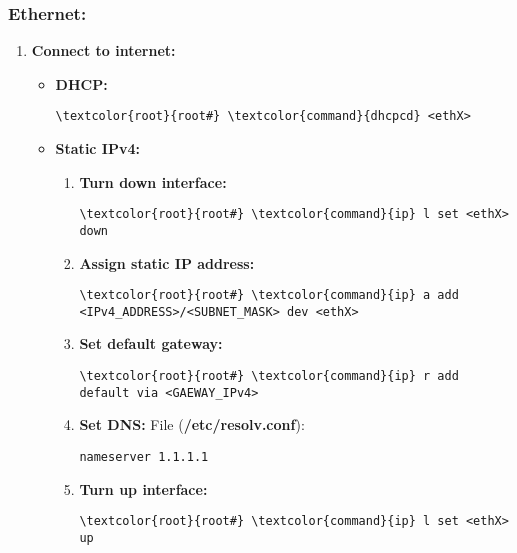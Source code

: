 \documentclass[10pt, a4paper, onecolumn, openany]{book} %
\begin{document}
\subsubsection{Ethernet:}
\begin{enumerate}
    \item \textbf{Connect to internet:}
    \begin{itemize}
        \item \textbf{DHCP:}
 \begin{Verbatim}[commandchars=\\\{\}]
\textcolor{root}{root#} \textcolor{command}{dhcpcd} <ethX>
\end{Verbatim}       
        \item \textbf{Static IPv4:}
        \begin{enumerate}
            \item \textbf{Turn down interface:}
\begin{Verbatim}[commandchars=\\\{\}]
\textcolor{root}{root#} \textcolor{command}{ip} l set <ethX> down
\end{Verbatim}
            \item \textbf{Assign static IP address:}
\begin{Verbatim}[commandchars=\\\{\}]
\textcolor{root}{root#} \textcolor{command}{ip} a add <IPv4_ADDRESS>/<SUBNET_MASK> dev <ethX>
\end{Verbatim}
            \item \textbf{Set default gateway:}
\begin{Verbatim}[commandchars=\\\{\}]
\textcolor{root}{root#} \textcolor{command}{ip} r add default via <GAEWAY_IPv4>
\end{Verbatim}
            \item \textbf{Set DNS:}
\newline File (\textbf{\textcolor{file}{/etc/resolv.conf}}):
\begin{Verbatim}[commandchars=\\\{\}]
nameserver 1.1.1.1
\end{Verbatim}
            \item \textbf{Turn up interface:}
\begin{Verbatim}[commandchars=\\\{\}]
\textcolor{root}{root#} \textcolor{command}{ip} l set <ethX> up
\end{Verbatim}
        \end{enumerate}
    \end{itemize}
\end{enumerate}
\end{document}
